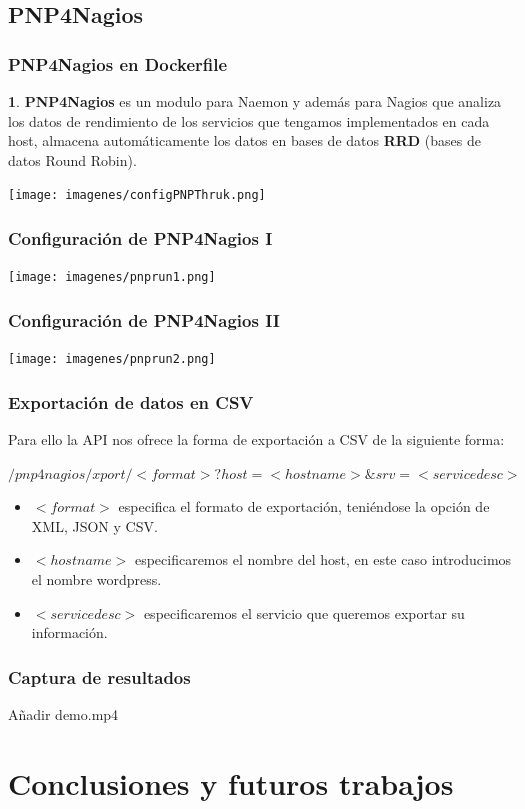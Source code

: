 \documentclass{beamer}
\theoremstyle{plain}
\theoremstyle{definition}
\newtheorem{defn}[thm]{}
\theoremstyle{plain}
\theoremstyle{definition}
\theoremstyle{remark}
\theoremstyle{definition}
\begin{document}
\subsection{PNP4Nagios}

\begin{frame}
	\frametitle{PNP4Nagios en Dockerfile}
	\begin{defn}
		\textbf{PNP4Nagios} es un modulo para Naemon y además para
		Nagios que analiza los datos de rendimiento de los servicios que tengamos implementados en cada host, almacena automáticamente los datos en bases	de datos \textbf{RRD} (bases de datos Round Robin).
	\end{defn}

\centering
\texttt{[image: imagenes/configPNPThruk.png]}
\end{frame}
\begin{frame}
	\frametitle{Configuración de PNP4Nagios I}
	\centering
	\texttt{[image: imagenes/pnprun1.png]}
\end{frame}
\begin{frame}
	\frametitle{Configuración de PNP4Nagios II}
	\centering
	\texttt{[image: imagenes/pnprun2.png]}
\end{frame}
\begin{frame}
	\frametitle{Exportación de datos en CSV}
	Para ello la API nos ofrece la forma de
	exportación a CSV de la siguiente forma:
	
	\textbf{$/pnp4nagios/xport/<format>?host=<hostname>\&srv=<servicedesc>$}
	\begin{itemize} 
	\item \textbf{$<format>$} especifica el formato de exportación, teniéndose la opción de XML, JSON y CSV.
	\item \textbf{$<hostname>$} especificaremos el nombre del host, en este caso introducimos el nombre wordpress.
	\item \textbf{$<servicedesc>$} especificaremos el servicio que queremos exportar su información.
	\end{itemize} 
\end{frame}
\begin{frame}
	\frametitle{Captura de resultados}
	Añadir demo.mp4
\end{frame}


\section{Conclusiones y futuros trabajos}
\end{document}
